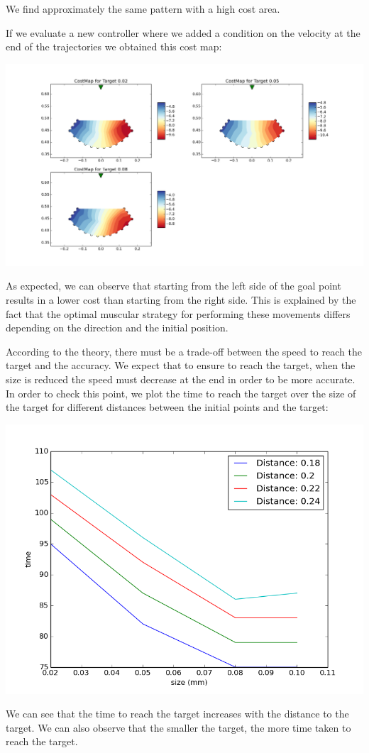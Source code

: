 \documentclass[pdftex,a4paper,12pt]{report}
\begin{document}
We find approximately the same pattern with a high cost area.

If we evaluate a new controller where we added a condition on the velocity at the end of the trajectories we obtained this cost map:
\begin{center}
\includegraphics[scale=0.3]{figures/costMapSpeed.png}
\end{center}
As expected, we can observe that starting from the left side of the goal point results in a lower cost than starting from the right side. This is explained by the fact that the optimal muscular strategy for performing these movements differs depending on the direction and the initial position.

According to the theory, there must be a trade-off between the speed to reach the target and the accuracy. We expect that to ensure to reach the target, when the size is reduced the speed must decrease at the end in order to be more accurate.
In order to check this point, we plot the time to reach the target over the size of the target for different distances between the initial points and the target:
\begin{center}
\includegraphics[scale=0.5]{figures/timeDistance.png}
\end{center}
We can see that the time to reach the target increases with the distance to the target.
We can also observe that the smaller the target, the more time taken to reach the target.
\end{document}
